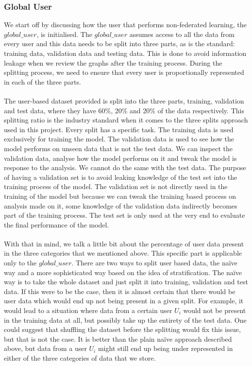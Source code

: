 \documentclass[12pt]{article}
\begin{document}
\subsubsection{Global User}
We start off by discussing how the user that performs non-federated learning, the $global\_user$, is initialised. The $global\_user$ assumes access to all the data from every user and this data needs to be split into three parts, as is the standard: training data, validation data and testing data. This is done to avoid information leakage when we review the graphs after the training process. During the splitting process, we need to ensure that every user is proportionally represented in each of the three parts.
\\\\
The user-based dataset provided is split into the three parts, training, validation and test data, where they have 60\%, 20\% and 20\% of the data respectively. This splitting ratio is the industry standard when it comes to the three splits approach used in this project. Every split has a specific task. The training data is used exclusively for training the model. The validation data is used to see how the model performs on unseen data that is not the test data. We can inspect the validation data, analyse how the model performs on it and tweak the model is response to the analysis. We cannot do the same with the test data. The purpose of having a validation set is to avoid leaking knowledge of the test set into the training process of the model. The validation set is not directly used in the training of the model but because we can tweak the training based process on analysis made on it, some knowledge of the validation data indirectly becomes part of the training process. The test set is only used at the very end to evaluate the final performance of the model.
\\\\
With that in mind, we talk a little bit about the percentage of user data present in the three categories that we mentioned above. This specific part is applicable only to the $global\_user$. There are two ways to split user based data, the na\"ive way and a more sophisticated way based on the idea of stratification. The na\"ive way is to take the whole dataset and just split it into training, validation and test data. If this were to be the case, then it is almost certain that there would be user data which would end up not being present in a given split. For example, it would lead to a situation where data from a certain user $U_i$ would not be present in the training data at all, but possibly take up the entirety of the test data. One could suggest that shuffling the dataset before the splitting would fix this issue, but that is not the case. It is better than the plain na\"ive approach described above, but data from a user $U_i$ might still end up being under represented in either of the three categories of data that we store.
\end{document}
